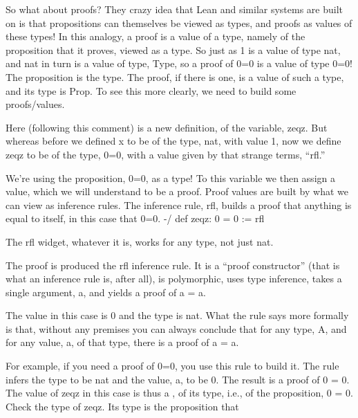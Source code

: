 \documentclass[letterpaper,10pt,english]{sphinxmanual}
\begin{document}
So what about proofs? They crazy idea that Lean and similar systems
are built on is that propositions can themselves be viewed as types,
and proofs as values of these types! In this analogy, a proof is a
value of a type, namely of the proposition that it proves, viewed as a
type. So just as 1 is a value of type nat, and nat in turn is a value
of type, Type, so a proof of 0=0 is a value of type 0=0! The
proposition is the type. The proof, if there is one, is a value of
such a type, and its type is Prop. To see this more clearly, we need
to build some proofs/values.

Here (following this comment) is a new definition, of the variable,
zeqz. But whereas before we defined x to be of the type, nat, with
value 1, now we define zeqz to be of the type, 0=0, with a value given
by that strange terms, “rfl.”

We’re using the proposition, 0=0, as a type! To this variable we then
assign a value, which we will understand to be a proof. Proof values
are built by what we can view as inference rules. The inference rule,
rfl, builds a proof that anything is equal to itself, in this case
that 0=0.  -/ def zeqz: 0 = 0 := rfl

The rfl widget, whatever it is, works for any type, not just nat.

\begin{sphinxVerbatim}[commandchars=\\\{\}]
      
\end{sphinxVerbatim}

The proof is produced the rfl inference rule.  It is a “proof
constructor” (that is what an inference rule is, after all), is
polymorphic, uses type inference, takes a single argument, a, and
yields a proof of a = a.

The value in this case is 0 and the type is nat. What the rule says
more formally is that, without any premises you can always conclude
that for any type, A, and for any value, a, of that type, there is a
proof of a = a.

For example, if you need a proof of 0=0, you use this rule to build
it. The rule infers the type to be nat and the value, a, to be 0. The
result is a proof of 0 = 0. The value of zeqz in this case is thus a
, of its type, i.e., of the proposition, 0 = 0. Check the type
of zeqz. Its type is the proposition that
\end{document}
